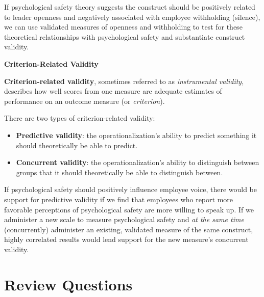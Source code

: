 \documentclass[
]{book}
\providecommand{\tightlist}{%
  \setlength{\itemsep}{0pt}\setlength{\parskip}{0pt}}
\begin{document}
If psychological safety theory suggests the construct should be positively related to leader openness and negatively associated with employee withholding (silence), we can use validated measures of openness and withholding to test for these theoretical relationships with psychological safety and substantiate construct validity.

\textbf{Criterion-Related Validity}

\textbf{Criterion-related validity}, sometimes referred to as \emph{instrumental validity}, describes how well scores from one measure are adequate estimates of performance on an outcome measure (or \emph{criterion}).

There are two types of criterion-related validity:

\begin{itemize}
\tightlist
\item
  \textbf{Predictive validity}: the operationalization's ability to predict something it should theoretically be able to predict.
\item
  \textbf{Concurrent validity}: the operationalization's ability to distinguish between groups that it should theoretically be able to distinguish between.
\end{itemize}

If psychological safety should positively influence employee voice, there would be support for predictive validity if we find that employees who report more favorable perceptions of psychological safety are more willing to speak up. If we administer a new scale to measure psychological safety and \emph{at the same time} (concurrently) administer an existing, validated measure of the same construct, highly correlated results would lend support for the new measure's concurrent validity.

\hypertarget{review-questions-2}{%
\section{Review Questions}\label{review-questions-2}}
\end{document}

